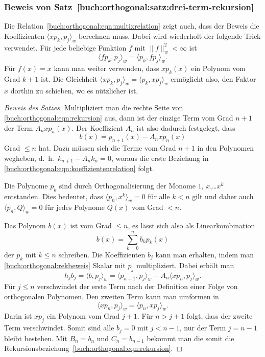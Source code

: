 \subsubsection{Beweis von Satz~\ref{buch:orthogonal:satz:drei-term-rekursion}}
Die Relation~\eqref{buch:orthogonal:eqn:multixrelation} zeigt auch,
dass der Beweis die Koeffizienten $\langle xp_k,p_j\rangle_w$
berechnen muss.
Dabei wird wiederholt der folgende Trick verwendet.
Für jede beliebige Funktion $f$ mit $\|f\|_w^2<\infty$ ist
\[
\langle fp_k,p_j\rangle_w
=
\langle p_k,fp_j\rangle_w.
\]
Für $f(x)=x$ kann man weiter verwenden, dass $xp_k(x)$ ein Polynom
vom Grad $k+1$ ist.
Die Gleichheit $\langle xp_k,p_j\rangle_w=\langle p_k,xp_j\rangle_w$
ermöglicht also, den Faktor $x$ dorthin zu schieben, wo es nützlicher ist.

\begin{proof}[Beweis des Satzes]
Multipliziert man die rechte Seite von
\eqref{buch:orthogonal:eqn:rekursion} aus, dann ist der einzige Term
vom Grad $n+1$ der Term $A_nxp_n(x)$.
Der Koeffizient $A_n$ ist also dadurch festgelegt, dass
\begin{equation}
b(x)
=
p_{n+1}(x) - A_nxp_n(x)
\label{buch:orthogonal:rekbeweis}
\end{equation}
Grad $\le n$ hat.
Dazu müssen sich die Terme vom Grad $n+1$ in den Polynomen wegheben,
d.~h.~$k_{n+1}-A_nk_n=0$, woraus die erste Beziehung in
\eqref{buch:orthogonal:eqn:koeffizientenrelation} folgt.

Die Polynome $p_k$ sind durch Orthogonalisierung der Monome
$1$, $x$,\dots $x^{k}$ entstanden.
Dies bedeutet, dass $\langle p_n,x^k\rangle_w=0$ für alle $k<n$
gilt und daher auch $\langle p_n,Q\rangle_w=0$ für jedes Polynome
$Q(x)$ vom Grad $<n$.

Das Polynom $b(x)$ ist vom Grad $\le n$, es lässt sich also als
Linearkombination
\[
b(x) = \sum_{k=0}^n b_k p_k(x)
\]
der $p_k$ mit $k\le n$ schreiben.
Die Koeffizienten $b_j$ kann man erhalten, indem man 
\eqref{buch:orthogonal:rekbeweis} Skalar mit $p_j$ multipliziert.
Dabei erhält man
\[
h_jb_j
=
\langle b,p_j\rangle_w
=
\langle p_{n+1},p_j\rangle_w
-
A_n\langle xp_n,p_j\rangle_w.
\]
Für $j\le n$ verschwindet der erste Term nach der Definition einer
Folge von orthogonalen Polynomen.
Den zweiten Term kann man umformen in
\[
\langle xp_n,p_j\rangle_w
=
\langle p_n,xp_j\rangle_w.
\]
Darin ist $xp_j$ ein Polynom vom Grad $j+1$.
Für $n>j+1$ folgt, dass der zweite Term verschwindet.
Somit sind alle $b_j=0$ mit $j<n-1$, nur der Term $j=n-1$
bleibt bestehen.
Mit $B_n=b_n$ und $C_n=b_{n-1}$ bekommt man die somit die
Rekursionsbeziehung~\eqref{buch:orthogonal:eqn:rekursion}.


\end{proof}
